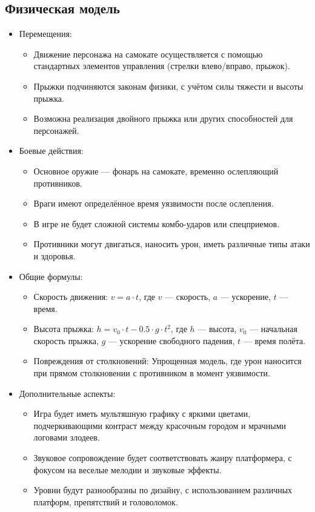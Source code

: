 \documentclass[article,12pt, fleqn]{article}
\begin{document}
\begin{itemize}
\subsection{Физическая модель}
\begin{itemize}
    \item Перемещения: 
    \begin{itemize}
        \item Движение персонажа на самокате осуществляется с помощью стандартных элементов управления (стрелки влево/вправо, прыжок). 
        \item Прыжки подчиняются законам физики, с учётом силы тяжести и высоты прыжка. 
        \item Возможна реализация двойного прыжка или других способностей для персонажей. 
        \end{itemize}
    \item Боевые действия:
    \begin{itemize}
        \item Основное оружие — фонарь на самокате, временно ослепляющий противников. 
        \item Враги имеют определённое время уязвимости после ослепления. 
        \item В игре не будет сложной системы комбо-ударов или спецприемов. 
        \item Противники могут двигаться, наносить урон, иметь различные типы атаки и здоровья. 
    \end{itemize}
    \item Общие формулы:
    \begin{itemize}
        \item Скорость движения: $v = a\cdot t$, где $v$ --- скорость, $a$ --- ускорение, $t$ --- время. 
        \item Высота прыжка: $h = v_0 \cdot t - 0.5\cdot g\cdot t^2$, где $h$ --- высота, $v_0$ --- начальная скорость прыжка, $g$ --- ускорение свободного падения, $t$ --- время полёта.
        \item Повреждения от столкновений: Упрощенная модель, где урон наносится при прямом столкновении с противником в момент уязвимости.
    \end{itemize}
    \item Дополнительные аспекты: 
    \begin{itemize}
        \item Игра будет иметь мультяшную графику с яркими цветами, подчеркивающими контраст между красочным городом и мрачными логовами злодеев. 
        \item Звуковое сопровождение будет соответствовать жанру платформера, с фокусом на веселые мелодии и звуковые эффекты. 
        \item Уровни будут разнообразны по дизайну, с использованием различных платформ, препятствий и головоломок.
    \end{itemize}
\end{itemize}

\end{itemize}
\end{document}
